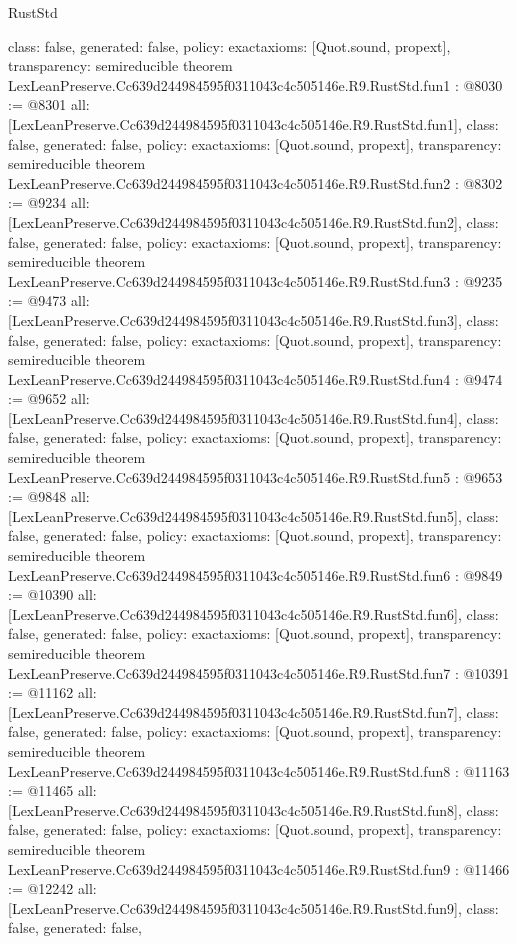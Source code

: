 \begin{lexlean}{RustStd}
\begin{coremodule}
{  class: false,
  generated: false,
  policy: exact{axioms: [Quot.sound, propext]},
  transparency: semireducible
}
theorem LexLeanPreserve.Cc639d244984595f0311043c4c505146e.R9.RustStd.fun1 : @8030 := @8301 {
  all: [LexLeanPreserve.Cc639d244984595f0311043c4c505146e.R9.RustStd.fun1],
  class: false,
  generated: false,
  policy: exact{axioms: [Quot.sound, propext]},
  transparency: semireducible
}
theorem LexLeanPreserve.Cc639d244984595f0311043c4c505146e.R9.RustStd.fun2 : @8302 := @9234 {
  all: [LexLeanPreserve.Cc639d244984595f0311043c4c505146e.R9.RustStd.fun2],
  class: false,
  generated: false,
  policy: exact{axioms: [Quot.sound, propext]},
  transparency: semireducible
}
theorem LexLeanPreserve.Cc639d244984595f0311043c4c505146e.R9.RustStd.fun3 : @9235 := @9473 {
  all: [LexLeanPreserve.Cc639d244984595f0311043c4c505146e.R9.RustStd.fun3],
  class: false,
  generated: false,
  policy: exact{axioms: [Quot.sound, propext]},
  transparency: semireducible
}
theorem LexLeanPreserve.Cc639d244984595f0311043c4c505146e.R9.RustStd.fun4 : @9474 := @9652 {
  all: [LexLeanPreserve.Cc639d244984595f0311043c4c505146e.R9.RustStd.fun4],
  class: false,
  generated: false,
  policy: exact{axioms: [Quot.sound, propext]},
  transparency: semireducible
}
theorem LexLeanPreserve.Cc639d244984595f0311043c4c505146e.R9.RustStd.fun5 : @9653 := @9848 {
  all: [LexLeanPreserve.Cc639d244984595f0311043c4c505146e.R9.RustStd.fun5],
  class: false,
  generated: false,
  policy: exact{axioms: [Quot.sound, propext]},
  transparency: semireducible
}
theorem LexLeanPreserve.Cc639d244984595f0311043c4c505146e.R9.RustStd.fun6 : @9849 := @10390 {
  all: [LexLeanPreserve.Cc639d244984595f0311043c4c505146e.R9.RustStd.fun6],
  class: false,
  generated: false,
  policy: exact{axioms: [Quot.sound, propext]},
  transparency: semireducible
}
theorem LexLeanPreserve.Cc639d244984595f0311043c4c505146e.R9.RustStd.fun7 : @10391 := @11162 {
  all: [LexLeanPreserve.Cc639d244984595f0311043c4c505146e.R9.RustStd.fun7],
  class: false,
  generated: false,
  policy: exact{axioms: [Quot.sound, propext]},
  transparency: semireducible
}
theorem LexLeanPreserve.Cc639d244984595f0311043c4c505146e.R9.RustStd.fun8 : @11163 := @11465 {
  all: [LexLeanPreserve.Cc639d244984595f0311043c4c505146e.R9.RustStd.fun8],
  class: false,
  generated: false,
  policy: exact{axioms: [Quot.sound, propext]},
  transparency: semireducible
}
theorem LexLeanPreserve.Cc639d244984595f0311043c4c505146e.R9.RustStd.fun9 : @11466 := @12242 {
  all: [LexLeanPreserve.Cc639d244984595f0311043c4c505146e.R9.RustStd.fun9],
  class: false,
  generated: false,
}
\end{coremodule}
\end{lexlean}
